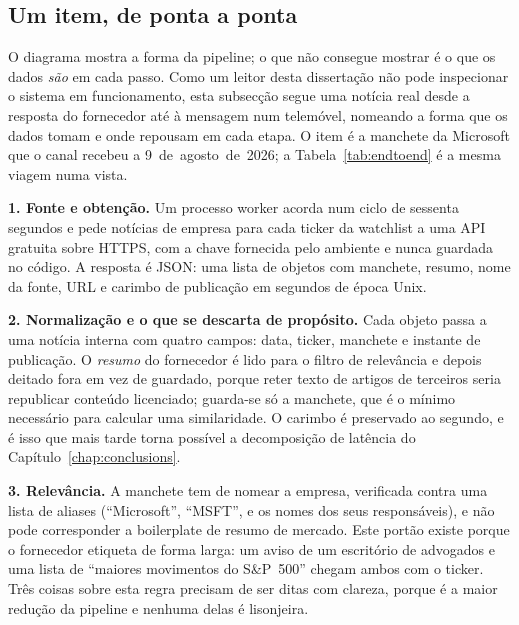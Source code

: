 \subsection*{Um item, de ponta a ponta}
\label{sec:investigator_endtoend}

O diagrama mostra a forma da pipeline; o que não consegue mostrar é o que os dados \emph{são} em cada
passo. Como um leitor desta dissertação não pode inspecionar o sistema em funcionamento, esta
subsecção segue uma notícia real desde a resposta do fornecedor até à mensagem num telemóvel,
nomeando a forma que os dados tomam e onde repousam em cada etapa. O item é a manchete da Microsoft
que o canal recebeu a 9~de~agosto~de~2026; a Tabela~\ref{tab:endtoend} é a mesma viagem numa vista.

\textbf{1. Fonte e obtenção.} Um processo worker acorda num ciclo de sessenta segundos e pede
notícias de empresa para cada ticker da watchlist a uma API gratuita sobre HTTPS, com a chave
fornecida pelo ambiente e nunca guardada no código. A resposta é JSON: uma lista de objetos com
manchete, resumo, nome da fonte, URL e carimbo de publicação em segundos de época Unix.

\textbf{2. Normalização e o que se descarta de propósito.} Cada objeto passa a uma notícia interna
com quatro campos: data, ticker, manchete e instante de publicação. O \emph{resumo} do fornecedor é
lido para o filtro de relevância e depois deitado fora em vez de guardado, porque reter texto de
artigos de terceiros seria republicar conteúdo licenciado; guarda-se só a manchete, que é o mínimo
necessário para calcular uma similaridade. O carimbo é preservado ao segundo, e é isso que mais tarde
torna possível a decomposição de latência do Capítulo~\ref{chap:conclusions}.

\textbf{3. Relevância.} A manchete tem de nomear a empresa, verificada contra uma lista de aliases
(``Microsoft'', ``MSFT'', e os nomes dos seus responsáveis), e não pode corresponder a boilerplate de
resumo de mercado. Este portão existe porque o fornecedor etiqueta de forma larga: um aviso de um
escritório de advogados e uma lista de ``maiores movimentos do S\&P~500'' chegam ambos com o ticker.
Três coisas sobre esta regra precisam de ser ditas com clareza, porque é a maior redução da pipeline e
nenhuma delas é lisonjeira.

